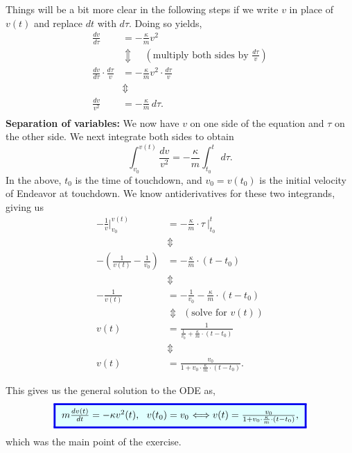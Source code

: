 Things will be a bit more clear in the following steps if we write $v$ in place of $v(t)$ and replace $dt$ with $d \tau$. Doing so yields,
\begin{align*}
     \frac{dv}{d \tau} &=  - \frac{\kappa}{m} v^2\\
     & \Updownarrow ~~~  ~~(\text{multiply both sides by } \frac{d \tau}{v})\\
    \frac{dv}{d \tau} \cdot \frac{d \tau}{v} &=  - \frac{\kappa}{m} v^2 \cdot \frac{d \tau}{v}\\
     & \Updownarrow \\
    \frac{dv}{v^2}&=  - \frac{\kappa}{m} \, d \tau.\\     
\end{align*}
\textbf{Separation of variables:} We now have $v$ on one side of the equation and $\tau$ on the other side. We next integrate both sides to obtain
$$ \int_{v_0}^{v(t)}  \frac{dv}{v^2}=  - \frac{\kappa}{m} \int_{t_0}^t  \, d \tau.$$
In the above, $t_0$ is the time of touchdown, and $v_0=v(t_0)$ is the initial velocity of Endeavor at touchdown. We know antiderivatives for these two integrands, giving us
\begin{align*}
- \frac{1}{v}\bigg|_{v_0}^{v(t)} &=  -\frac{\kappa}{m} \cdot \tau~\bigg|_{t_0}^t \\
                                & \Updownarrow \\
-\left(\frac{1}{v(t)} - \frac{1}{v_0} \right)   &= -\frac{\kappa}{m} \cdot \left( t - t_0 \right) \\     
  & \Updownarrow   \\
   -\frac{1}{v(t)}  &=  -\frac{1}{v_0} -\frac{\kappa}{m} \cdot \left( t - t_0 \right)\\
    & \Updownarrow  ~~(\text{solve for }v(t))\\ 
    v(t) & = \frac{1}{\frac{1}{v_0} + \frac{\kappa}{m} \cdot \left( t - t_0 \right)} \\
     & \Updownarrow  \\
   v(t) & = \frac{v_0}{1 + v_0 \cdot \frac{\kappa}{m} \cdot \left( t - t_0 \right)}.   
\end{align*}

This gives us the general solution to the ODE as,
\begin{equation}
    \label{eq:ODEHorizontalLinearDragSolution}
    \setlength{\fboxrule}{2pt} %
    \fcolorbox{brightblue}{lightblue}{%
    \addtolength{\fboxsep}{5pt} %
    \( m \frac{dv(t)}{dt} =  - \kappa v^2(t),~~  v(t_0)=v_0  \) \(\Longleftrightarrow v(t) = \frac{v_0}{1 + v_0 \cdot \frac{\kappa}{m} \cdot \left( t - t_0 \right)}  \),
    }
\end{equation}
which was the main point of the exercise. \\

